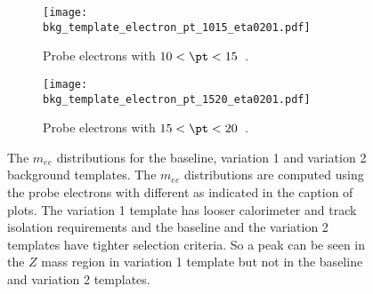 \begin{table}[htbp]
    \caption{The definition of the background templates for estimating the background contamination associated with the $Z$ tag-and-probe method.
    The baseline template is used to estimate the background contamination.
    The variation 1 template has looser requirements and the variation 2 template has tighter requirements.
    They are used to assess the systematic caused by the background contamination.}
    \label{tab:app_RLE_bkg_templates}
\end{table}

\begin{figure}[htb]
    \begin{subfigure}[b]{0.48\textwidth}
        \begin{center}
            \texttt{[image: bkg\_template\_electron\_pt\_1015\_eta0201.pdf]}
            \caption{Probe electrons with $10 < \pt < 15$~{\GeV}.}
        \end{center}
    \end{subfigure}
    \begin{subfigure}[b]{0.48\textwidth}
        \begin{center}
            \texttt{[image: bkg\_template\_electron\_pt\_1520\_eta0201.pdf]}
            \caption{Probe electrons with $15 < \pt < 20$~{\GeV}.}
        \end{center}
    \end{subfigure}
    \caption{The $m_{ee}$ distributions for the baseline, variation 1 and variation 2 background templates.
    The $m_{ee}$ distributions are computed using the probe electrons with different \pt as indicated in the caption of plots.
    The variation 1 template has looser calorimeter and track isolation requirements and the baseline and the variation 2 templates have tighter selection criteria.
    So a peak can be seen in the $Z$ mass region in variation 1 template but not in the baseline and variation 2 templates.}
    \label{fig:app_RLE_bkg_templates}
\end{figure}

